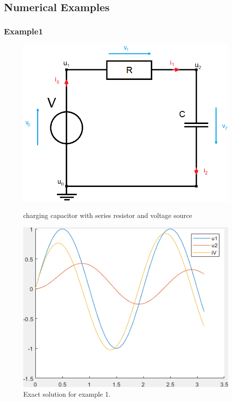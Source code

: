 	
	
	\subsection*{Numerical Examples}
	
	\subsubsection{Example1}
	
	\begin{frame}
		\begin{figure}[H]
			\centering
			\begin{minipage}{.5\textwidth}
				\centering
				\includegraphics[width=\linewidth]{../Tex/pictures/Example1_simple_p2.png}
				\caption{charging capacitor with series resistor and voltage source}
				\label{fig:charging capacitor}
			\end{minipage}%
			\begin{minipage}{.5\textwidth}
				\centering
				\includegraphics[width=\linewidth]{../Matlab/exact_solution_ex1.png}
				\caption{Exact solution for example 1.}
				\label{fig: Exact solution for example 1}
			\end{minipage}
		\end{figure}
	\end{frame}
	
